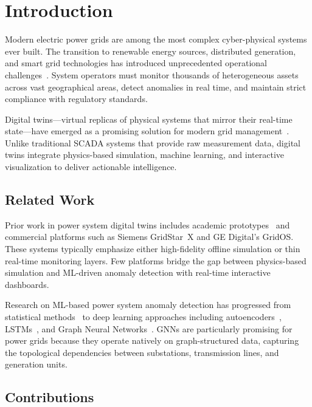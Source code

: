 \documentclass[conference]{IEEEtran}
\begin{document}
\section{Introduction}

Modern electric power grids are among the most complex cyber-physical systems ever built. The transition to renewable energy sources, distributed generation, and smart grid technologies has introduced unprecedented operational challenges~\cite{ieee_digital_twin_2023}. System operators must monitor thousands of heterogeneous assets across vast geographical areas, detect anomalies in real time, and maintain strict compliance with regulatory standards.

Digital twins---virtual replicas of physical systems that mirror their real-time state---have emerged as a promising solution for modern grid management~\cite{grieves_digital_twin_2014, boschert_digital_twin_2018}. Unlike traditional SCADA systems that provide raw measurement data, digital twins integrate physics-based simulation, machine learning, and interactive visualization to deliver actionable intelligence.

\subsection{Related Work}

Prior work in power system digital twins includes academic prototypes~\cite{zhou_digital_twin_2021} and commercial platforms such as Siemens GridStar~X and GE Digital's GridOS. These systems typically emphasize either high-fidelity offline simulation or thin real-time monitoring layers. Few platforms bridge the gap between physics-based simulation and ML-driven anomaly detection with real-time interactive dashboards.

Research on ML-based power system anomaly detection has progressed from statistical methods~\cite{zhang_mv_2019} to deep learning approaches including autoencoders~\cite{wang_autoencoder_2020}, LSTMs~\cite{hong_lstm_2021}, and Graph Neural Networks~\cite{liao_gnn_2021, chen_gnn_2022}. GNNs are particularly promising for power grids because they operate natively on graph-structured data, capturing the topological dependencies between substations, transmission lines, and generation units.

\subsection{Contributions}
\end{document}
